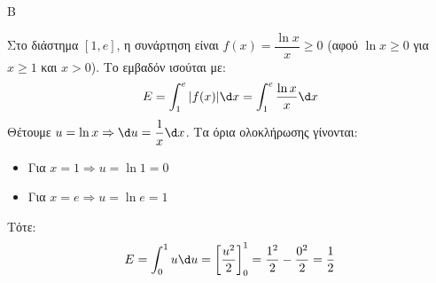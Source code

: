 \begin{thema}{Β}
\begin{erwthma}
\item Στο διάστημα $[1, e]$, η συνάρτηση είναι $f(x) = \dfrac{\ln x}{x} \ge 0$ (αφού $\ln x \ge 0$ για $x \ge 1$ και $x>0$). Το εμβαδόν ισούται με:
\[ E = \int_1^e |f(x)| \d x = \int_1^e \dfrac{\ln x}{x} \d x \]
Θέτουμε $u = \ln x \Rightarrow \d u = \dfrac{1}{x} \d x$.
Τα όρια ολοκλήρωσης γίνονται:
\begin{itemize}
\item Για $x = 1 \Rightarrow u = \ln 1 = 0$
\item Για $x = e \Rightarrow u = \ln e = 1$
\end{itemize}
Τότε:
\[ E = \int_0^1 u \d u = \left[ \dfrac{u^2}{2} \right]_0^1 = \dfrac{1^2}{2} - \dfrac{0^2}{2} = \dfrac{1}{2} \]
\end{erwthma}
\end{thema}

